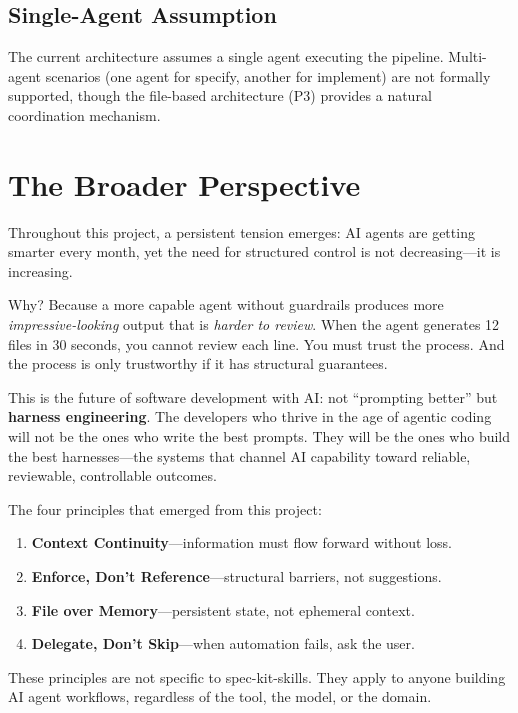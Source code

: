 \documentclass[11pt,a4paper,openright,twoside]{report}
\begin{document}
\subsection{Single-Agent Assumption}

The current architecture assumes a single agent executing the pipeline. Multi-agent scenarios (one agent for specify, another for implement) are not formally supported, though the file-based architecture (P3) provides a natural coordination mechanism.

\section{The Broader Perspective}

Throughout this project, a persistent tension emerges: AI agents are getting smarter every month, yet the need for structured control is not decreasing---it is increasing.

Why? Because a more capable agent without guardrails produces more \emph{impressive-looking} output that is \emph{harder to review}. When the agent generates 12 files in 30 seconds, you cannot review each line. You must trust the process. And the process is only trustworthy if it has structural guarantees.

This is the future of software development with AI: not ``prompting better'' but \textbf{harness engineering}. The developers who thrive in the age of agentic coding will not be the ones who write the best prompts. They will be the ones who build the best harnesses---the systems that channel AI capability toward reliable, reviewable, controllable outcomes.

The four principles that emerged from this project:

\begin{enumerate}
  \item \textbf{Context Continuity}---information must flow forward without loss.
  \item \textbf{Enforce, Don't Reference}---structural barriers, not suggestions.
  \item \textbf{File over Memory}---persistent state, not ephemeral context.
  \item \textbf{Delegate, Don't Skip}---when automation fails, ask the user.
\end{enumerate}

These principles are not specific to spec-kit-skills. They apply to anyone building AI agent workflows, regardless of the tool, the model, or the domain.
\end{document}
